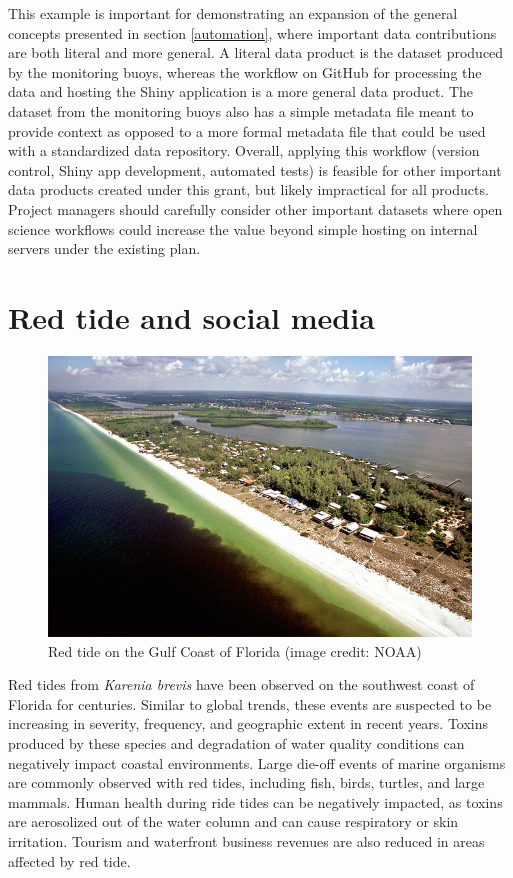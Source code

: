 \documentclass[
]{book}
\begin{document}
This example is important for demonstrating an expansion of the general concepts presented in section \ref{automation}, where important data contributions are both literal and more general. A literal data product is the dataset produced by the monitoring buoys, whereas the workflow on GitHub for processing the data and hosting the Shiny application is a more general data product. The dataset from the monitoring buoys also has a simple metadata file meant to provide context as opposed to a more formal metadata file that could be used with a standardized data repository. Overall, applying this workflow (version control, Shiny app development, automated tests) is feasible for other important data products created under this grant, but likely impractical for all products. Project managers should carefully consider other important datasets where open science workflows could increase the value beyond simple hosting on internal servers under the existing plan.

\hypertarget{twitter}{%
\section{Red tide and social media}\label{twitter}}

\begin{figure}

{\centering \includegraphics[width=0.8\linewidth]{img/red tide} 

}

\caption{Red tide on the Gulf Coast of Florida (image credit: NOAA)}\label{fig:unnamed-chunk-14}
\end{figure}

Red tides from \emph{Karenia brevis} have been observed on the southwest coast of Florida for centuries. Similar to global trends, these events are suspected to be increasing in severity, frequency, and geographic extent in recent years. Toxins produced by these species and degradation of water quality conditions can negatively impact coastal environments. Large die-off events of marine organisms are commonly observed with red tides, including fish, birds, turtles, and large mammals. Human health during ride tides can be negatively impacted, as toxins are aerosolized out of the water column and can cause respiratory or skin irritation. Tourism and waterfront business revenues are also reduced in areas affected by red tide.
\end{document}
